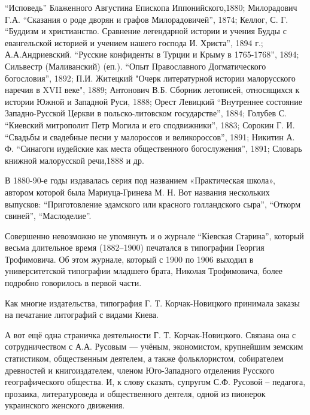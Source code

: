 \enquote{Исповедь} Блаженного Августина Епископа Иппонийского,1880; Милорадович Г.А.
\enquote{Сказания о роде дворян и графов Милорадовичей}, 1874; Келлог, С. Г. \enquote{Буддизм и
христианство. Сравнение легендарной истории и учения Будды с евангельской
историей и учением нашего господа И. Христа}, 1894 г.; А.А.Андриевский.
\enquote{Русские конфиденты в Турции и Крыму в 1765-1768}, 1894; Сильвестр
(Маливанский) (еп.). \enquote{Опыт Православного Догматического богословия}, 1892; П.И.
Житецкий "Очерк литературной истории малорусского наречия в XVII веке", 1889;
Антонович В.Б. Сборник летописей, относящихся к истории Южной и Западной Руси,
1888; Орест Левицкий \enquote{Внутреннее состояние Западно-Русской Церкви в
польско-литовском государстве}, 1884; Голубев С. \enquote{Киевский митрополит Петр
Могила и его сподвижники}, 1883; Сорокин Г. И. \enquote{Свадьбы и свадебные песни у
малороссов и великороссов}, 1891; Никитин А. Ф. \enquote{Синагоги иудейские как места
общественного богослужения}, 1891; Словарь книжной малорусской речи,1888 и др.  


В 1880-90-е годы издавалась серия под названием «Практическая школа», автором
которой была Мариуца-Гринева М. Н. Вот названия нескольких выпусков:
\enquote{Приготовление эдамского или красного голландского сыра}, \enquote{Откорм свиней},
\enquote{Маслоделие}.


Совершенно невозможно не упомянуть и о журнале \enquote{Кіевская Старина}, который
весьма длительное время (1882–1900) печатался в типографии Георгия Трофимовича.
Об этом  журнале, который с 1900 по 1906 выходил в университетской типографии
младшего брата, Николая Трофимовича, более подробно говорилось в первой части. 


Как многие издательства, типография Г. Т. Корчак-Новицкого принимала заказы на
печатание литографий с видами Киева.

А вот ещё одна страничка деятельности Г. Т. Корчак-Новицкого. Связана она с
сотрудничеством с А.А. Русовым — учёным, экономистом, крупнейшим земским
статистиком, общественным деятелем, а также фольклористом, собирателем
древностей и книгоиздателем, членом Юго-Западного отделения Русского
географического общества. И, к слову сказать, супругом  С.Ф. Русовой ‒
педагога, прозаика, литературоведа и общественного деятеля, одной из пионерок
украинского женского движения.

